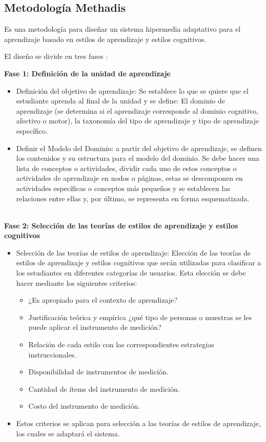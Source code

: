 \subsection{Metodología Methadis}
Es una metodología para diseñar un sistema hipermedia adaptativo para el aprendizaje basado en estilos de aprendizaje y estilos cognitivos.

El diseño se divide en tres fases \cite{Ferraro2006}:

\textbf{Fase 1: Definición de la unidad de aprendizaje}
\begin{itemize}
    \item Definición del objetivo de aprendizaje: Se establece lo que se quiere que el estudiante aprenda al final de la unidad y se define: El dominio de aprendizaje (se determina si el aprendizaje corresponde al dominio cognitivo, afectivo o motor), la taxonomía del tipo de aprendizaje y tipo de aprendizaje específico.

    \item Definir el Modelo del Dominio: a partir del objetivo de aprendizaje, se definen los contenidos y su estructura para el modelo del dominio. Se debe hacer una lista de conceptos o actividades, dividir cada uno de estos conceptos o actividades de aprendizaje en nodos o páginas, estas se descomponen en actividades específicas o conceptos más pequeños y se establecen las relaciones entre ellas y, por último, se representa en forma esquematizada.

\end{itemize} \ \\
\textbf{Fase 2: Selección de las teorías de estilos de aprendizaje y estilos cognitivos}
\begin{itemize}
    \item Selección de las teorías de estilos de aprendizaje: Elección de las teorías de estilos de aprendizaje y estilos cognitivos que serán utilizadas para clasificar a los estudiantes en diferentes categorías de usuarios. Esta elección se debe hacer mediante los siguientes criterios: 
\begin{itemize}
    \item ¿Es apropiado para el contexto de aprendizaje?
    \item Justificación teórica y empírica ¿qué tipo de personas o muestras se les puede aplicar el instrumento de medición?
    \item Relación de cada estilo con las correspondientes estrategias instruccionales.
    \item Disponibilidad de instrumentos de medición.
    \item Cantidad de ítems del instrumento de medición.
    \item Costo del instrumento de medición. 
\end{itemize}
\item Estos criterios se aplican para selección a las teorías de estilos de aprendizaje, los cuales se adaptará el sistema.
\end{itemize} \ \\
